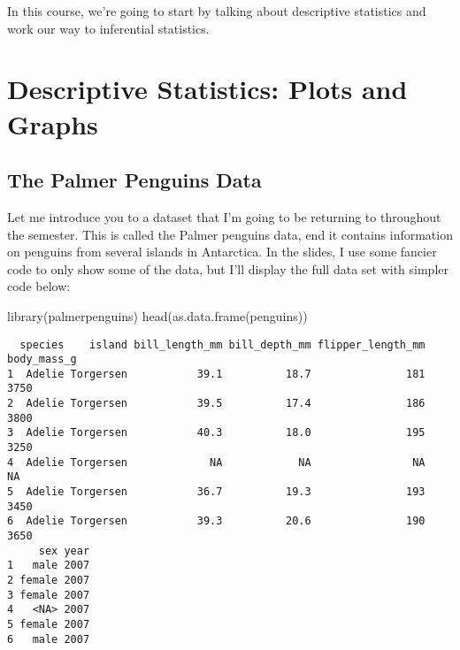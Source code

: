 \documentclass[
  letterpaper,
  DIV=11,
  numbers=noendperiod]{scrreprt}
\newenvironment{Shaded}{\begin{snugshade}}{\end{snugshade}}
\newcommand{\FunctionTok}[1]{\textcolor[rgb]{0.28,0.35,0.67}{#1}}
\newcommand{\NormalTok}[1]{\textcolor[rgb]{0.00,0.23,0.31}{#1}}
\begin{document}
In this course, we're going to start by talking about descriptive
statistics and work our way to inferential statistics.

\hypertarget{descriptive-statistics-plots-and-graphs}{%
\section{Descriptive Statistics: Plots and
Graphs}\label{descriptive-statistics-plots-and-graphs}}

\hypertarget{the-palmer-penguins-data}{%
\subsection{The Palmer Penguins Data}\label{the-palmer-penguins-data}}

Let me introduce you to a dataset that I'm going to be returning to
throughout the semester. This is called the Palmer penguins data, end it
contains information on penguins from several islands in Antarctica. In
the slides, I use some fancier code to only show some of the data, but
I'll display the full data set with simpler code below:

\begin{Shaded}
\begin{Highlighting}[]
\FunctionTok{library}\NormalTok{(palmerpenguins)}
\FunctionTok{head}\NormalTok{(}\FunctionTok{as.data.frame}\NormalTok{(penguins))}
\end{Highlighting}
\end{Shaded}

\begin{verbatim}
  species    island bill_length_mm bill_depth_mm flipper_length_mm body_mass_g
1  Adelie Torgersen           39.1          18.7               181        3750
2  Adelie Torgersen           39.5          17.4               186        3800
3  Adelie Torgersen           40.3          18.0               195        3250
4  Adelie Torgersen             NA            NA                NA          NA
5  Adelie Torgersen           36.7          19.3               193        3450
6  Adelie Torgersen           39.3          20.6               190        3650
     sex year
1   male 2007
2 female 2007
3 female 2007
4   <NA> 2007
5 female 2007
6   male 2007
\end{verbatim}
\end{document}
